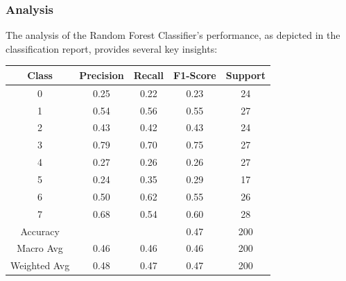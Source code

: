 \documentclass[12pt]{article}
\begin{document}
\subsubsection{Analysis}
The analysis of the Random Forest Classifier's performance, as depicted in the classification report, provides several key insights:
\begin{center}
    \begin{tabular}{|c|c|c|c|c|}
    \hline
    Class & Precision & Recall & F1-Score & Support \\
    \hline
    0 & 0.25 & 0.22 & 0.23 & 24 \\
    1 & 0.54 & 0.56 & 0.55 & 27 \\
    2 & 0.43 & 0.42 & 0.43 & 24 \\
    3 & 0.79 & 0.70 & 0.75 & 27 \\
    4 & 0.27 & 0.26 & 0.26 & 27 \\
    5 & 0.24 & 0.35 & 0.29 & 17 \\
    6 & 0.50 & 0.62 & 0.55 & 26 \\
    7 & 0.68 & 0.54 & 0.60 & 28 \\
    \hline
    Accuracy & & & 0.47 & 200 \\
    \hline
    Macro Avg & 0.46 & 0.46 & 0.46 & 200 \\
    Weighted Avg & 0.48 & 0.47 & 0.47 & 200 \\
    \hline
    \end{tabular}
    \end{center}
    
\end{document}
